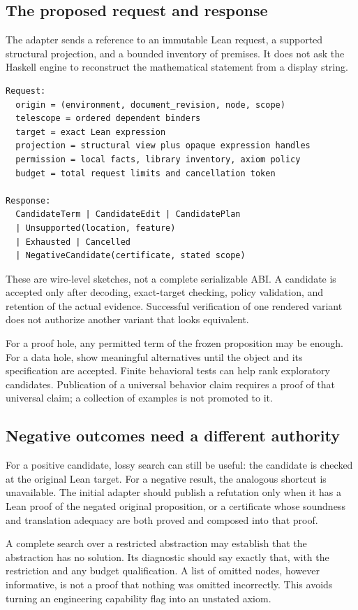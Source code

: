 \documentclass[11pt,a4paper]{article}
\theoremstyle{remark}\newtheorem{example}[proposition]{Example}
\begin{document}
\subsection{The proposed request and response}
The adapter sends a reference to an immutable Lean request, a supported structural projection, and a bounded inventory of premises. It does not ask the Haskell engine to reconstruct the mathematical statement from a display string.
\begin{lstlisting}
Request:
  origin = (environment, document_revision, node, scope)
  telescope = ordered dependent binders
  target = exact Lean expression
  projection = structural view plus opaque expression handles
  permission = local facts, library inventory, axiom policy
  budget = total request limits and cancellation token

Response:
  CandidateTerm | CandidateEdit | CandidatePlan
  | Unsupported(location, feature)
  | Exhausted | Cancelled
  | NegativeCandidate(certificate, stated scope)
\end{lstlisting}
These are wire-level sketches, not a complete serializable ABI. A candidate is accepted only after decoding, exact-target checking, policy validation, and retention of the actual evidence. Successful verification of one rendered variant does not authorize another variant that looks equivalent.

For a proof hole, any permitted term of the frozen proposition may be enough. For a data hole, show meaningful alternatives until the object and its specification are accepted. Finite behavioral tests can help rank exploratory candidates. Publication of a universal behavior claim requires a proof of that universal claim; a collection of examples is not promoted to it.

\subsection{Negative outcomes need a different authority}
For a positive candidate, lossy search can still be useful: the candidate is checked at the original Lean target. For a negative result, the analogous shortcut is unavailable. The initial adapter should publish a refutation only when it has a Lean proof of the negated original proposition, or a certificate whose soundness and translation adequacy are both proved and composed into that proof.

A complete search over a restricted abstraction may establish that the abstraction has no solution. Its diagnostic should say exactly that, with the restriction and any budget qualification. A list of omitted nodes, however informative, is not a proof that nothing was omitted incorrectly. This avoids turning an engineering capability flag into an unstated axiom.
\end{document}
